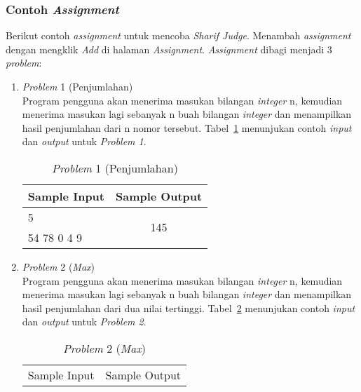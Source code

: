 \subsubsection{Contoh \textit{Assignment}}

Berikut contoh \textit{assignment} untuk mencoba \textit{Sharif Judge}. Menambah \textit{assignment} dengan mengklik \textit{Add} di halaman \textit{Assignment}. \textit{Assignment} dibagi menjadi 3 \textit{problem}:
\begin{enumerate}
	\item \textit{Problem} 1 (Penjumlahan) \\
	Program pengguna akan menerima masukan bilangan \textit{integer} n, kemudian menerima masukan lagi sebanyak n buah bilangan \textit{integer} dan menampilkan hasil penjumlahan dari n nomor tersebut. Tabel~\ref{tab:tablesum} menunjukan contoh \textit{input} dan \textit{output} untuk \textit{Problem 1}.
	
	\begin{table}[H] %
		\centering 
		\caption{\textit{Problem} 1 (Penjumlahan)}
		\label{tab:tablesum}
		\begin{tabular}{|c|c|}
			\hline
			Sample Input & Sample Output\\
			
			\hline
			\multicolumn{1}{|l|}{5} & \multirow{2}{*}{145}\\
			\multicolumn{1}{|l|}{54 78 0 4 9} & \\
			
			\hline
			
		\end{tabular} 
	\end{table}
	
	\item \textit{Problem} 2 (\textit{Max}) \\
	Program pengguna akan menerima masukan bilangan \textit{integer} n, kemudian menerima masukan lagi sebanyak n buah bilangan \textit{integer} dan menampilkan hasil penjumlahan dari dua nilai tertinggi. Tabel~\ref{tab:tablemax} menunjukan contoh \textit{input} dan \textit{output} untuk \textit{Problem 2}.
	
	\begin{table}[H] %
		\centering 
		\caption{\textit{Problem} 2 (\textit{Max})}
		\label{tab:tablemax}
		\begin{tabular}{|c|c|}
			\hline
			Sample Input & Sample Output\\
			

\end{tabular}
\end{table}
\end{enumerate}
